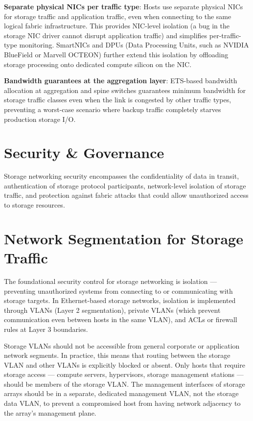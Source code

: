 \textbf{Separate physical NICs per traffic type}: Hosts use separate physical NICs for storage traffic and application traffic, even when connecting to the same logical fabric infrastructure. This provides NIC-level isolation (a bug in the storage NIC driver cannot disrupt application traffic) and simplifies per-traffic-type monitoring. SmartNICs and DPUs (Data Processing Units, such as NVIDIA BlueField or Marvell OCTEON) further extend this isolation by offloading storage processing onto dedicated compute silicon on the NIC.

\textbf{Bandwidth guarantees at the aggregation layer}: ETS-based bandwidth allocation at aggregation and spine switches guarantees minimum bandwidth for storage traffic classes even when the link is congested by other traffic types, preventing a worst-case scenario where backup traffic completely starves production storage I/O.

\section{Security \& Governance}
Storage networking security encompasses the confidentiality of data in transit, authentication of storage protocol participants, network-level isolation of storage traffic, and protection against fabric attacks that could allow unauthorized access to storage resources.

\section{Network Segmentation for Storage Traffic}
The foundational security control for storage networking is isolation --- preventing unauthorized systems from connecting to or communicating with storage targets. In Ethernet-based storage networks, isolation is implemented through VLANs (Layer 2 segmentation), private VLANs (which prevent communication even between hosts in the same VLAN), and ACLs or firewall rules at Layer 3 boundaries.

Storage VLANs should not be accessible from general corporate or application network segments. In practice, this means that routing between the storage VLAN and other VLANs is explicitly blocked or absent. Only hosts that require storage access --- compute servers, hypervisors, storage management stations --- should be members of the storage VLAN. The management interfaces of storage arrays should be in a separate, dedicated management VLAN, not the storage data VLAN, to prevent a compromised host from having network adjacency to the array's management plane.

